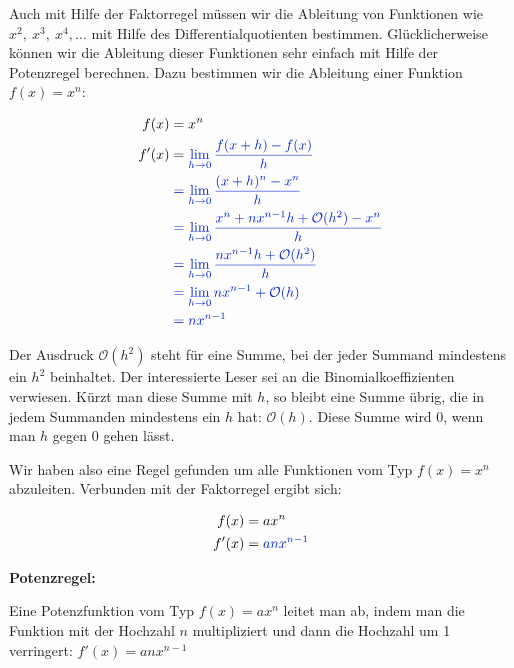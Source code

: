 Auch mit Hilfe der Faktorregel müssen wir die Ableitung von Funktionen wie \(x^2,\ x^3,\ x^4,\dots\) mit Hilfe des Differentialquotienten bestimmen. Glücklicherweise können wir die Ableitung dieser Funktionen sehr einfach mit Hilfe der Potenzregel berechnen. Dazu bestimmen wir die Ableitung einer Funktion \(f(x)=x^n\):

\begin{minipage}{\textwidth}
	\begin{minipage}{0.5\textwidth}
		\begin{align*}
			f(x)&=x^n\\
			f'(x)&=\textcolor{loes}{\lim\limits_{h\to 0}\frac{f(x+h)-f(x)}{h}}\\
			&\textcolor{loes}{\;=\lim\limits_{h\to 0}\frac{(x+h)^n-x^n}{h}}\\
			&\textcolor{loes}{\;=\lim\limits_{h\to 0}\frac{x^n+nx^{n-1}h+\mathcal{O}(h^2)-x^n}{h}}\\
			&\textcolor{loes}{\;=\lim\limits_{h\to 0}\frac{nx^{n-1}h+\mathcal{O}(h^2)}{h}}\\
			&\textcolor{loes}{\;=\lim\limits_{h\to 0}nx^{n-1}+\mathcal{O}(h)}\\
			&\textcolor{loes}{\;=nx^{n-1}}
		\end{align*}
	\end{minipage}%
	\begin{minipage}{0.5\textwidth}
		\textcolor{loes}{Der Ausdruck \(\mathcal{O}(h^2)\) steht für eine Summe, bei der jeder Summand mindestens ein \(h^2\) beinhaltet. Der interessierte Leser sei an die Binomialkoeffizienten verwiesen. Kürzt man diese Summe mit \(h\), so bleibt eine Summe übrig, die in jedem Summanden mindestens ein \(h\) hat: \(\mathcal{O}(h)\). Diese Summe wird 0, wenn man \(h\) gegen 0 gehen lässt.}
	\end{minipage}%
\end{minipage}
Wir haben also eine Regel gefunden um alle Funktionen vom Typ \(f(x)=x^n\) abzuleiten. Verbunden mit der Faktorregel ergibt sich:

\bigskip

\begin{minipage}{\textwidth}
	\begin{minipage}{0.3\textwidth}
		\begin{align*}
			f(x)&=ax^n\\
			f'(x)&=\textcolor{loes}{anx^{n-1}}
		\end{align*}
	\end{minipage}%
	\begin{minipage}{0.7\textwidth}
		\begin{tcolorbox}
			\textbf{Potenzregel:}

			\textcolor{loestc}{Eine Potenzfunktion vom Typ \(f(x)=ax^n\) leitet man ab, indem man die Funktion mit der Hochzahl \(n\) multipliziert und dann die Hochzahl um 1 verringert: \(f'(x)=anx^{n-1}\)}

            \bigskip

		\end{tcolorbox}
	\end{minipage}%
\end{minipage}

